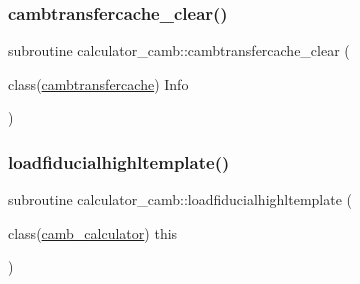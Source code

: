 \mbox{\label{namespacecalculator__camb_a74de7ed91f31c5cccb3f6c738f689295}} 
\subsubsection{\texorpdfstring{cambtransfercache\+\_\+clear()}{cambtransfercache\_clear()}}
{\footnotesize\ttfamily subroutine calculator\+\_\+camb\+::cambtransfercache\+\_\+clear (\begin{DoxyParamCaption}\item[{class(\mbox{\hyperlink{structcalculator__camb_1_1cambtransfercache}{cambtransfercache}})}]{Info }\end{DoxyParamCaption})\hspace{0.3cm}{\ttfamily [private]}}

\mbox{\label{namespacecalculator__camb_a8eeaa2b45303d1bb5c7323cbf4767ce7}} 
\subsubsection{\texorpdfstring{loadfiducialhighltemplate()}{loadfiducialhighltemplate()}}
{\footnotesize\ttfamily subroutine calculator\+\_\+camb\+::loadfiducialhighltemplate (\begin{DoxyParamCaption}\item[{class(\mbox{\hyperlink{structcalculator__camb_1_1camb__calculator}{camb\+\_\+calculator}})}]{this }\end{DoxyParamCaption})}

